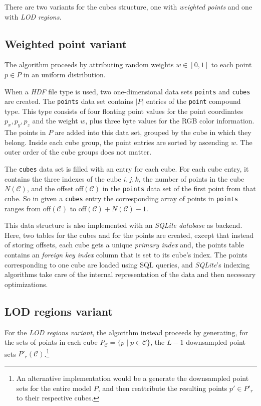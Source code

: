 \documentclass[a4paper,10pt,abstracton,notitlepage]{scrreprt}
\begin{document}
There are two variants for the cubes structure, one with \emph{weighted points} and one with \emph{LOD regions}. 

\subsection{Weighted point variant}
The algorithm proceeds by attributing random weights $w \in [0,1]$ to each point $p \in P$ in an uniform distribution.

When a \emph{HDF} file type is used, two one-dimensional data sets \texttt{points} and \texttt{cubes} are created. The \texttt{points} data set contains $|P|$ entries of the \texttt{point} compound type. This type consists of four floating point values for the point coordinates $p_{x}, p_{y}, p_{z}$ and the weight $w$, plus three byte values for the RGB color information. The points in $P$ are added into this data set, grouped by the cube in which they belong. Inside each cube group, the point entries are sorted by ascending $w$. The outer order of the cube groups does not matter.

The \texttt{cubes} data set is filled with an entry for each cube. For each cube entry, it contains the three indexes of the cube $i, j, k$, the number of points in the cube $N(\mathcal{C})$, and the offset $\text{off}(\mathcal{C})$ in the \texttt{points} data set of the first point from that cube. So in given a \texttt{cubes} entry the corresponding array of points in \texttt{points} ranges from $\text{off}(\mathcal{C})$ to $\text{off}(\mathcal{C}) + N(\mathcal{C}) - 1$.

This data structure is also implemented with an \emph{SQLite database} as backend. Here, two tables for the cubes and for the points are created, except that instead of storing offsets, each cube gets a unique \emph{primary index} and, the points table contains an \emph{foreign key index} column that is set to its cube's index. The points corresponding to one cube are loaded using SQL queries, and \emph{SQLite}'s indexing algorithms take care of the internal representation of the data and then necessary optimizations.

\subsection{LOD regions variant}
For the \emph{LOD regions variant}, the algorithm instead proceeds by generating, for the sets of points in each cube $P_{\mathcal{C}} = \{ p \mid p \in \mathcal{C} \}$, the $L-1$ downsampled point sets $P'_{r}(\mathcal{C})$.\footnote{An alternative implementation would be a generate the downsampled point sets for the entire model $P$, and then reattribute the resulting points $p' \in P'_{r}$ to their respective cubes.}
\end{document}
